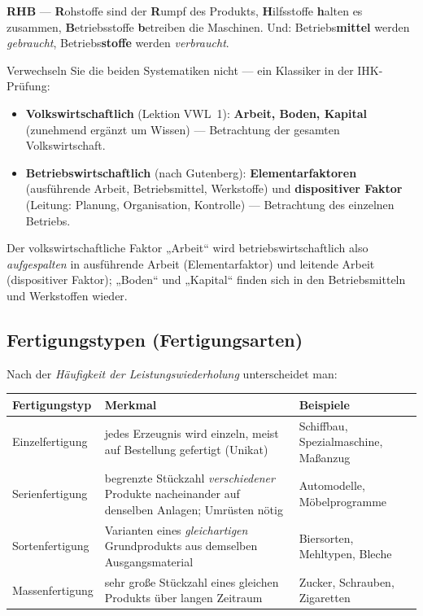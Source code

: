 \documentclass[11pt, a4paper]{article}
\begin{document}
\begin{eselsbruecke}
\textbf{RHB} --- \textbf{R}ohstoffe sind der \textbf{R}umpf des Produkts,
\textbf{H}ilfsstoffe \textbf{h}alten es zusammen, \textbf{B}etriebsstoffe
\textbf{b}etreiben die Maschinen. Und: Betriebs\textbf{mittel} werden
\emph{gebraucht}, Betriebs\textbf{stoffe} werden \emph{verbraucht}.
\end{eselsbruecke}

\begin{merksatz}[title={\bfseries Abgrenzung: volkswirtschaftliche vs. betriebswirtschaftliche Produktionsfaktoren}]
Verwechseln Sie die beiden Systematiken nicht --- ein Klassiker in der IHK-Prüfung:
\begin{itemize}
  \item \textbf{Volkswirtschaftlich} (Lektion VWL~1): \textbf{Arbeit, Boden, Kapital}
    (zunehmend ergänzt um Wissen) --- Betrachtung der gesamten Volkswirtschaft.
  \item \textbf{Betriebswirtschaftlich} (nach Gutenberg): \textbf{Elementarfaktoren}
    (ausführende Arbeit, Betriebsmittel, Werkstoffe) und \textbf{dispositiver Faktor}
    (Leitung: Planung, Organisation, Kontrolle) --- Betrachtung des einzelnen Betriebs.
\end{itemize}
Der volkswirtschaftliche Faktor „Arbeit`` wird betriebswirtschaftlich also
\emph{aufgespalten} in ausführende Arbeit (Elementarfaktor) und leitende Arbeit
(dispositiver Faktor); „Boden`` und „Kapital`` finden sich in den Betriebsmitteln und
Werkstoffen wieder.
\end{merksatz}

\subsection{Fertigungstypen (Fertigungsarten)}

Nach der \emph{Häufigkeit der Leistungswiederholung} unterscheidet man:

\begin{center}
\begin{tabular}{p{3.4cm} p{6.2cm} p{4.6cm}}
\textbf{Fertigungstyp} & \textbf{Merkmal} & \textbf{Beispiele}\\
\hline
Einzelfertigung & jedes Erzeugnis wird einzeln, meist auf Bestellung gefertigt (Unikat) & Schiffbau, Spezialmaschine, Maßanzug\\
Serienfertigung & begrenzte Stückzahl \emph{verschiedener} Produkte nacheinander auf denselben Anlagen; Umrüsten nötig & Automodelle, Möbelprogramme\\
Sortenfertigung & Varianten eines \emph{gleichartigen} Grundprodukts aus demselben Ausgangsmaterial & Biersorten, Mehltypen, Bleche\\
Massenfertigung & sehr große Stückzahl eines gleichen Produkts über langen Zeitraum & Zucker, Schrauben, Zigaretten\\
\end{tabular}
\end{center}
\end{document}
